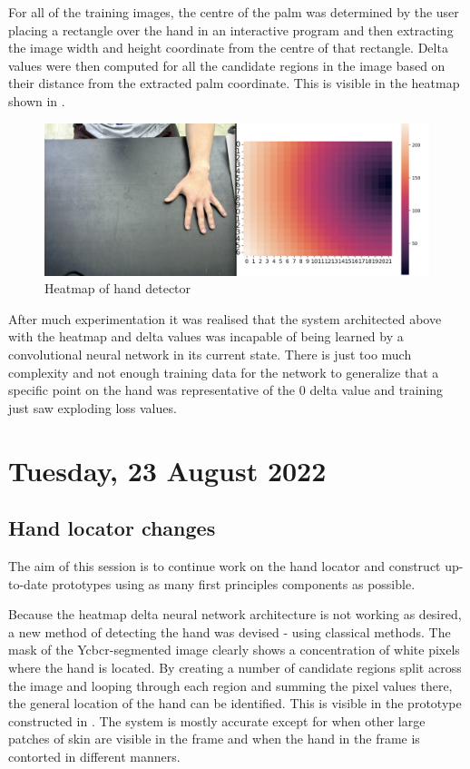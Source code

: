 For all of the training images, the centre of the palm was determined by the user placing a rectangle over the hand in an interactive program and then extracting the image width and height coordinate from the centre of that rectangle. Delta values were then computed for all the candidate regions in the image based on their distance from the extracted palm coordinate. This is visible in the heatmap shown in .

\begin{figure}[h]
    \centering
    \includegraphics[width=0.7\linewidth]{figures/heatmap_hand_detector.png}
    \caption{Heatmap of hand detector}
    \label{fig:heatmap_hand_detector}
\end{figure}

After much experimentation it was realised that the system architected above with the heatmap and delta values was incapable of being learned by a convolutional neural network in its current state. There is just too much complexity and not enough training data for the network to generalize that a specific point on the hand was representative of the 0 delta value and training just saw exploding loss values.

\section[2022/08/23]{Tuesday, 23 August 2022}

\subsection{Hand locator changes}

The aim of this session is to continue work on the hand locator and construct up-to-date prototypes using as many first principles components as possible.

Because the heatmap delta neural network architecture is not working as desired, a new method of detecting the hand was devised - using classical methods. The mask of the Ycbcr-segmented image clearly shows a concentration of white pixels where the hand is located. By creating a number of candidate regions split across the image and looping through each region and summing the pixel values there, the general location of the hand can be identified. This is visible in the prototype constructed in . The system is mostly accurate except for when other large patches of skin are visible in the frame and when the hand in the frame is contorted in different manners. \\

